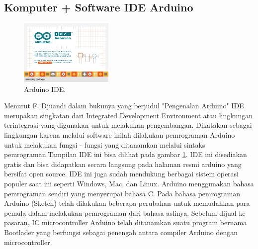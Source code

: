 \subsection{Komputer + Software IDE Arduino}
\begin{figure}[ht]
\centerline{\includegraphics[width=0.4\textwidth]{figures/aride11.png}}
\caption{Arduino IDE.}
\label{aide}
\end{figure}
Menurut F. Djuandi dalam bukunya yang berjudul "Pengenalan Arduino" \cite{djuandi2011pengenalan} IDE merupakan singkatan dari Integrated Development Environment atau lingkungan terintegrasi yang digunakan untuk melakukan pengembangan. Dikatakan sebagai lingkungan karena melalui software inilah dilakukan pemrograman Arduino untuk melakukan fungsi - fungsi yang ditanamkan melalui sintaks pemrograman.Tampilan IDE ini bisa dilihat pada gambar \ref{aide}. IDE ini disediakan gratis dan bisa didapatkan secara langsung pada halaman resmi arduino yang bersifat open source. IDE ini juga sudah mendukung berbagai sistem operasi populer saat ini seperti Windows, Mac, dan Linux. Arduino menggunakan bahasa pemrograman sendiri yang menyerupai bahasa C. Pada bahasa pemrograman Arduino (Sketch) telah dilakukan beberapa perubahan untuk memudahkan para pemula dalam melakukan pemrograman dari bahasa aslinya. Sebelum dijual ke pasaran, IC microcontroller Arduino telah ditanamkan suatu program bernama Bootlader yang berfungsi sebagai penengah antara compiler Arduino dengan microcontroller.

